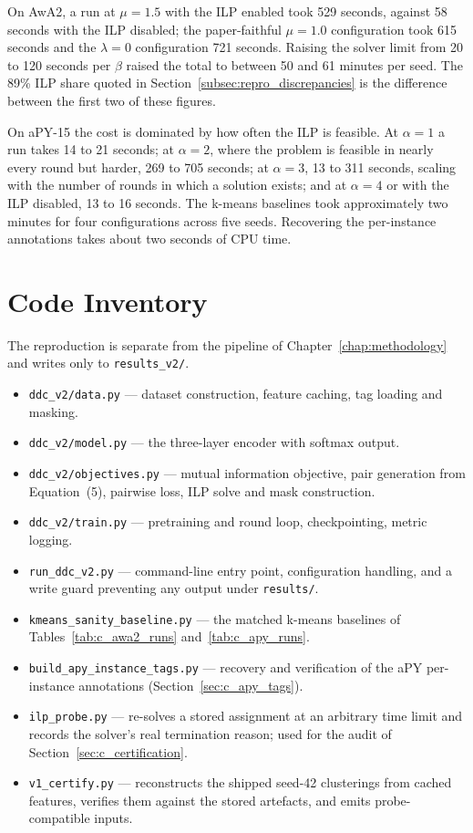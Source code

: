 On AwA2, a run at $\mu = 1.5$ with the ILP enabled took 529 seconds, against 58 seconds with the ILP disabled; the paper-faithful $\mu = 1.0$ configuration took 615 seconds and the $\lambda = 0$ configuration 721 seconds. Raising the solver limit from 20 to 120 seconds per $\beta$ raised the total to between 50 and 61 minutes per seed. The 89\% ILP share quoted in Section~\ref{subsec:repro_discrepancies} is the difference between the first two of these figures.

On aPY-15 the cost is dominated by how often the ILP is feasible. At $\alpha = 1$ a run takes 14 to 21 seconds; at $\alpha = 2$, where the problem is feasible in nearly every round but harder, 269 to 705 seconds; at $\alpha = 3$, 13 to 311 seconds, scaling with the number of rounds in which a solution exists; and at $\alpha = 4$ or with the ILP disabled, 13 to 16 seconds. The k-means baselines took approximately two minutes for four configurations across five seeds. Recovering the per-instance annotations takes about two seconds of CPU time.

\section{Code Inventory}
\label{sec:c_code}

The reproduction is separate from the pipeline of Chapter~\ref{chap:methodology} and writes only to \texttt{results\_v2/}.

\begin{itemize}[itemsep=2pt]
    \item \texttt{ddc\_v2/data.py} --- dataset construction, feature caching, tag loading and masking.
    \item \texttt{ddc\_v2/model.py} --- the three-layer encoder with softmax output.
    \item \texttt{ddc\_v2/objectives.py} --- mutual information objective, pair generation from Equation~(5), pairwise loss, ILP solve and mask construction.
    \item \texttt{ddc\_v2/train.py} --- pretraining and round loop, checkpointing, metric logging.
    \item \texttt{run\_ddc\_v2.py} --- command-line entry point, configuration handling, and a write guard preventing any output under \texttt{results/}.
    \item \texttt{kmeans\_sanity\_baseline.py} --- the matched k-means baselines of Tables~\ref{tab:c_awa2_runs} and~\ref{tab:c_apy_runs}.
    \item \texttt{build\_apy\_instance\_tags.py} --- recovery and verification of the aPY per-instance annotations (Section~\ref{sec:c_apy_tags}).
    \item \texttt{ilp\_probe.py} --- re-solves a stored assignment at an arbitrary time limit and records the solver's real termination reason; used for the audit of Section~\ref{sec:c_certification}.
    \item \texttt{v1\_certify.py} --- reconstructs the shipped seed-42 clusterings from cached features, verifies them against the stored artefacts, and emits probe-compatible inputs.
\end{itemize}